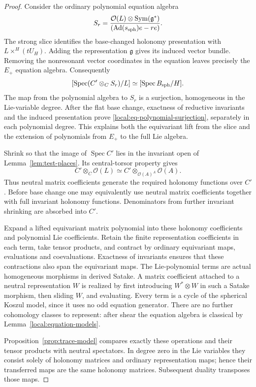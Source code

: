 \documentclass[11pt]{article}
\numberwithin{equation}{section}
\theoremstyle{definition}
\theoremstyle{remark}
\newcommand{\g}{\mathfrak g}
\newcommand{\cO}{\mathcal O}
\newcommand{\Ad}{\operatorname{Ad}}
\newcommand{\Spec}{\operatorname{Spec}}
\newcommand{\Sym}{\operatorname{Sym}}
\begin{document}
\begin{proof}
Consider the ordinary polynomial equation algebra
\[
 S_r=\frac{\cO(L)\otimes\Sym(\g^*)}
              {(\Ad(s_{\rm sph})e-re)}.
\]
The strong slice identifies the base-changed holonomy presentation
with $L\times^H(tU_H)$.  Adding the representation $\g$ gives its
induced vector bundle.  Removing the nonresonant vector coordinates
in the equation leaves precisely the $E_+$ equation algebra.
Consequently
\[
 [\Spec(C'\otimes_C S_r)/L]
       \simeq[\Spec B_{\rm sph}/H].
\]
The map from the polynomial algebra to $S_r$ is a surjection,
homogeneous in the Lie-variable degree.  After the flat base change,
exactness of reductive invariants and the induced presentation prove
\eqref{local:eq-polynomial-surjection}, separately in each polynomial
degree.  This explains both the equivariant lift from the slice and
the extension of polynomials from $E_+$ to the full Lie algebra.

Shrink so that the image of $\Spec C'$ lies in the invariant open
of Lemma~\ref{lem:test-places}.  Its central-torsor property gives
\[
 C'\otimes_C\cO(L)
       \simeq C'\otimes_{\cO(A)^A}\cO(A).
\]
Thus neutral matrix coefficients generate the required holonomy
functions over $C'$.  Before base change one may equivalently use
neutral matrix coefficients together with full invariant holonomy
functions.  Denominators from further invariant shrinking are
absorbed into $C'$.

Expand a lifted equivariant matrix polynomial into these holonomy
coefficients and polynomial Lie coefficients.  Retain the finite
representation coefficients in each term, take tensor products, and
contract by ordinary equivariant maps, evaluations and coevaluations.
Exactness of invariants ensures that these contractions also span
the equivariant maps.  The Lie-polynomial terms are actual homogeneous
morphisms in derived Satake.  A matrix coefficient attached to a
neutral representation $W$ is realized by first introducing
$W^*\otimes W$ in such a Satake morphism, then sliding $W$, and
evaluating.  Every term is a cycle of the spherical Koszul model,
since it uses no odd equation generator.  There are no further
cohomology classes to represent: after shear the equation algebra
is classical by Lemma~\ref{local:equation-models}.

Proposition~\ref{prop:trace-model} compares exactly these operations
and their tensor products with neutral spectators.  In degree zero
in the Lie variables they consist solely of holonomy matrices and
ordinary representation maps; hence their transferred maps are the
same holonomy matrices.  Subsequent duality transposes those maps.
\end{proof}
\end{document}
